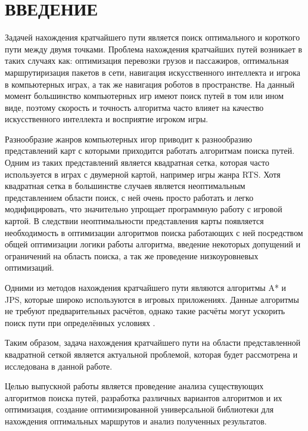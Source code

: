 \section*{ВВЕДЕНИЕ}

\vspace{1\baselineskip} 

Задачей нахождения кратчайшего пути является поиск оптимального и короткого пути между двумя точками. Проблема нахождения кратчайших путей возникает в таких случаях как: оптимизация перевозки грузов и пассажиров, оптимальная маршрутиризация пакетов в сети, навигация искусственного интеллекта и игрока в компьютерных играх, а так же навигация роботов в пространстве. На данный момент большинство компьютерных игр имеют поиск путей в том или ином виде, поэтому скорость и точность алгоритма часто влияет на качество искусственного интеллекта и восприятие игроком игры. 

Разнообразие жанров компьютерных игор приводит к разнообразию представлений карт с которыми приходится работать алгоритмам поиска путей. Одним из таких представлений является квадратная сетка, которая часто используется в играх с двумерной картой, например игры жанра RTS. Хотя квадратная сетка в большинстве случаев является неоптимальным представлением области поиск, с ней очень просто работать и легко модифицировать, что значительно упрощает программную работу с игровой картой. В следствии неоптимальности представления карты появляется необходимость в оптимизации алгоритмов поиска работающих с ней посредством общей оптимизации логики работы алгоритма, введение некоторых допущений и ограничений на область поиска, а так же проведение низкоуровневых оптимизаций.

Одними из методов нахождения кратчайшего пути являются алгоритмы A* и JPS, которые широко используются в игровых приложениях. Данные алгоритмы не требуют предварительных расчётов, однако такие расчёты могут ускорить поиск пути при определённых условиях \cite{PREPROCESSING}. 

Таким образом, задача нахождения кратчайшего пути на области представленной квадратной сеткой является актуальной проблемой, которая будет рассмотрена и исследована в данной работе.

Целью выпускной работы является проведение анализа существующих алгоритмов поиска путей, разработка различных вариантов алгоритмов и их оптимизация, создание оптимизированной универсальной библиотеки для нахождения оптимальных маршрутов и анализ полученных результатов.

